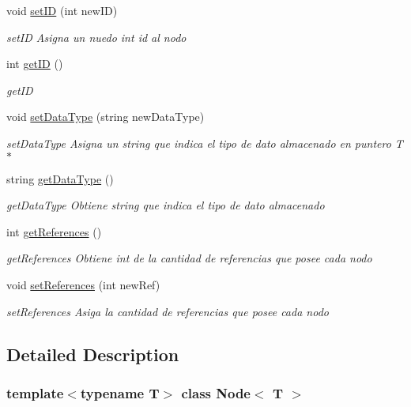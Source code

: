 \begin{DoxyCompactItemize}
void \hyperlink{class_node_af8fc96f8c1fe1948973eedfd3383d9e6}{set\+ID} (int new\+ID)
\begin{DoxyCompactList}\small\item\em set\+ID Asigna un nuedo int id al nodo \end{DoxyCompactList}\item 
int \hyperlink{class_node_a9735167ada11a354936bd597c56d6eb5}{get\+ID} ()
\begin{DoxyCompactList}\small\item\em get\+ID \end{DoxyCompactList}\item 
void \hyperlink{class_node_a1390ad2bd0dc9cf71b519ee159a7e8ca}{set\+Data\+Type} (string new\+Data\+Type)
\begin{DoxyCompactList}\small\item\em set\+Data\+Type Asigna un string que indica el tipo de dato almacenado en puntero T$\ast$ \end{DoxyCompactList}\item 
string \hyperlink{class_node_a86ff212da630a11b4a32ecccd26f9c4d}{get\+Data\+Type} ()
\begin{DoxyCompactList}\small\item\em get\+Data\+Type Obtiene string que indica el tipo de dato almacenado \end{DoxyCompactList}\item 
int \hyperlink{class_node_abc00227ad0e2f9aed2d28e63889c8ad1}{get\+References} ()
\begin{DoxyCompactList}\small\item\em get\+References Obtiene int de la cantidad de referencias que posee cada nodo \end{DoxyCompactList}\item 
void \hyperlink{class_node_a77ef6ecf6e4679e1f2b6ba6793df00e1}{set\+References} (int new\+Ref)
\begin{DoxyCompactList}\small\item\em set\+References Asiga la cantidad de referencias que posee cada nodo \end{DoxyCompactList}\end{DoxyCompactItemize}


\subsection{Detailed Description}
\subsubsection*{template$<$typename T$>$\newline
class Node$<$ T $>$}

